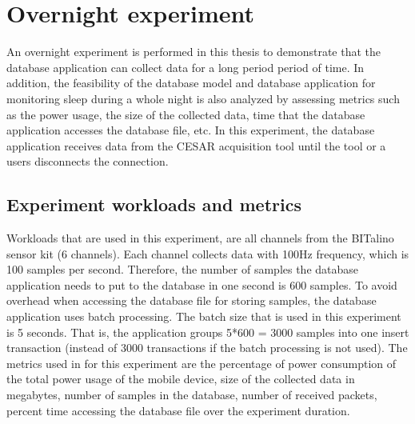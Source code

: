 \section{Overnight experiment}
An overnight experiment is performed in this thesis to demonstrate that the database application can collect data for a long period period of time. In addition, the feasibility of the database model and database application for monitoring sleep during a whole night is also analyzed by assessing metrics such as the power usage, the size of the collected data, time that the database application accesses the database file, etc. In this experiment, the database application receives data from the CESAR acquisition tool until the tool or a users disconnects the connection.
\subsection{Experiment workloads and metrics}
Workloads that are used in this experiment, are all channels from the BITalino sensor kit (6 channels). Each channel collects data with 100Hz frequency, which is 100 samples per second. Therefore, the number of samples the database application needs to put to the database in one second is 600 samples. To avoid overhead when accessing the database file for storing samples, the database application uses batch processing. The batch size that is used in this experiment is 5 seconds. That is, the application groups 5*600 = 3000 samples into one insert transaction (instead of 3000 transactions if the batch processing is not used). The metrics used in for this experiment are the percentage of power consumption of the total power usage of the mobile device, size of the collected data in megabytes, number of samples in the database, number of received packets, percent time accessing the database file over the experiment duration.
